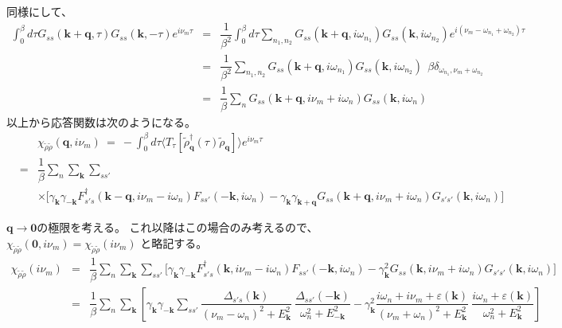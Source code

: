 \documentclass[a4j]{jsarticle}
\begin{document}
%
%
%
%
同様にして、
%
%
%
%
\begin{eqnarray}
	\int^{\beta}_{0} d \tau
	G_{ s s } ( \bm{k} + \bm{q} , \tau )
	G_{ s s } ( \bm{k} , - \tau )
	e^{i \nu_{m} \tau}
	&=&
	\dfrac{1}{\beta^{2}}
	\int^{\beta}_{0} d \tau
	\sum_{n_{1},n_{2}}
	G_{ s s } ( \bm{k} + \bm{q} , i \omega_{n_{1}} )
	G_{ s s } ( \bm{k} , i \omega_{n_{2}} )
	e^{i ( \nu_{m} - \omega_{n_{1}} + \omega_{n_{2}} ) \tau }
	\nonumber \\[2mm] &=&
	\dfrac{ 1 }{\beta^{2}} \sum_{n_{1},n_{2}}
	G_{ s s } ( \bm{k} + \bm{q} , i \omega_{n_{1}} )
	G_{ s s } ( \bm{k} , i \omega_{n_{2}} )
	\ \ \beta
	\delta_{ \omega_{n_{1}} , \nu_{m} + \omega_{n_{2}} }
	\nonumber \\[2mm] &=&
	\dfrac{ 1 }{\beta} \sum_{n}
	G_{ s s } ( \bm{k} + \bm{q} , i \nu_{m} + i \omega_{n} )
	G_{ s s } ( \bm{k} , i \omega_{n} )
\end{eqnarray}
%
%
%
%
以上から応答関数は次のようになる。
%
%
%
%
\begin{eqnarray}
	&&
	\chi_{\tilde{\rho} \tilde{\rho}}(\bm{q},i \nu_{m})
	\ = \
	-
	\int^{\beta}_{0} d \tau
	\langle T_{\tau}[ \tilde{\rho}_{\bm{q}}^{\dagger} (\tau) \tilde{\rho}_{\bm{q}} ] \rangle
	e^{i \nu_{m} \tau}
	\nonumber \ \\[2mm]
	&=&
	\dfrac{1}{\beta}
	\sum_{n}
	\sum_{ \bm{k} }
	\sum_{s s'}
    \\ && \times 
	\Big[
		\gamma_{\bm{k}}
		\gamma_{-\bm{k}}
		F_{ s' s }^{\dagger}( \bm{k} - \bm{q} , i \nu_{m} - i \omega_{n} )
		F_{ s s' } ( - \bm{k} , i \omega_{n} )
		-
		\gamma_{\bm{k}}
		\gamma_{\bm{k}+\bm{q}}
		G_{ s s } ( \bm{k} + \bm{q} , i \nu_{m} + i \omega_{n} )
		G_{ s' s' } ( \bm{k} , i \omega_{n} )
		\Big]
\end{eqnarray}
%
%
%
%

$\bm{q} \to \bm{0}$の極限を考える。
これ以降はこの場合のみ考えるので、
$\chi_{\tilde{\rho} \tilde{\rho}}(\bm{0},i \nu_{m}) = \chi_{\tilde{\rho} \tilde{\rho}}(i \nu_{m})$
と略記する。
%
%
%
%
\begin{eqnarray}
	\chi_{\tilde{\rho} \tilde{\rho}}(i \nu_{m})
	&=&
	\dfrac{1}{\beta}
	\sum_{n}
	\sum_{ \bm{k} }
	\sum_{s s'}
	\Big[
		\gamma_{\bm{k}}
		\gamma_{-\bm{k}}
		F_{ s' s }^{\dagger}( \bm{k} , i \nu_{m} - i \omega_{n} )
		F_{ s s' } ( - \bm{k} , i \omega_{n} )
		-
		\gamma_{\bm{k}}^{2}
		G_{ s s } ( \bm{k} , i \nu_{m} + i \omega_{n} )
		G_{ s' s' } ( \bm{k} , i \omega_{n} )
		\Big]
	\nonumber \ \\[2mm]
	&=&
	\dfrac{1}{\beta}
	\sum_{n}
	\sum_{ \bm{k} }
	\left[
		\gamma_{\bm{k}}
		\gamma_{-\bm{k}}
		\sum_{s s'}
		\dfrac{ \Delta_{s' s}(\bm{k}) }{ ( \nu_{m} - \omega_{n} )^{2} + E_{\bm{k}}^{2} }
		\
		\dfrac{ \Delta_{s s'}(-\bm{k}) }{ \omega_{n}^{2} + E_{-\bm{k}}^{2} }
		-
		\gamma_{\bm{k}}^{2}
		\dfrac{ i \omega_{n} + i \nu_{m} + \varepsilon(\bm{k}) }{ ( \nu_{m} + \omega_{n} )^{2} + E_{\bm{k}}^{2} }
		\
		\dfrac{ i \omega_{n} + \varepsilon(\bm{k}) }{ \omega_{n}^{2} + E_{\bm{k}}^{2} }
		\right]
\end{eqnarray}
%
%
%
%
\end{document}
